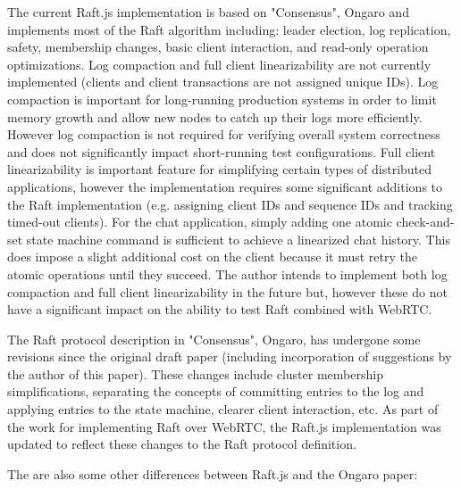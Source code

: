 \documentclass[9pt]{extarticle}
\begin{document}
\begin{multicols}{2}
The current Raft.js implementation is based on "Consensus", Ongaro and
implements most of the Raft algorithm including: leader election, log
replication, safety, membership changes, basic client interaction, and
read-only operation optimizations. Log compaction and full client
linearizability are not currently implemented (clients and client
transactions are not assigned unique IDs). Log compaction is important
for long-running production systems in order to limit memory growth
and allow new nodes to catch up their logs more efficiently. However
log compaction is not required for verifying overall system
correctness and does not significantly impact short-running test
configurations. Full client linearizability is important feature for
simplifying certain types of distributed applications, however the
implementation requires some significant additions to the Raft
implementation (e.g. assigning client IDs and sequence IDs and tracking
timed-out clients). For the chat application, simply adding one atomic
check-and-set state machine command is sufficient to achieve
a linearized chat history. This does impose a slight additional cost
on the client because it must retry the atomic operations until they
succeed. The author intends to implement both log compaction and
full client linearizability in the future but, however these do not
have a significant impact on the ability to test Raft combined with
WebRTC.

The Raft protocol description in "Consensus", Ongaro, has undergone
some revisions since the original draft paper (including incorporation
of suggestions by the author of this paper). These changes include
cluster membership simplifications, separating the concepts of
committing entries to the log and applying entries to the state
machine, clearer client interaction, etc. As part of the work for
implementing Raft over WebRTC, the Raft.js implementation was updated
to reflect these changes to the Raft protocol definition.

The are also some other differences between Raft.js and the Ongaro
paper:


\end{multicols}
\end{document}
